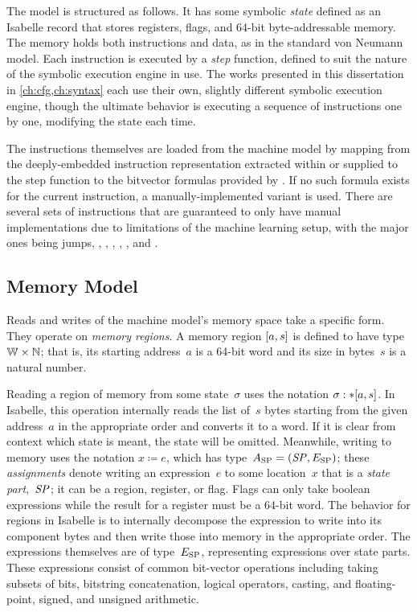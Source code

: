 The model is structured as follows.
It has some symbolic \emph{state} defined as an Isabelle record
that stores registers, flags, and 64-bit byte-addressable memory.
The memory holds both instructions and data, as in the standard von Neumann model.%
Each instruction is executed by a \emph{step} function,%
defined to suit the nature of the symbolic execution engine in use.
The works presented in this dissertation in \cref{ch:cfg,ch:syntax}
each use their own, slightly different symbolic execution engine,
though the ultimate behavior is executing a sequence of instructions one by one,
modifying the state each time.

The instructions themselves are loaded from the machine model
by mapping from the deeply-embedded instruction representation
extracted within or supplied to the step function
to the bitvector formulas provided by \textcite{roessle2019}.
If no such formula exists for the current instruction,
a manually-implemented variant is used.
There are several sets of instructions
that are guaranteed to only have manual implementations due to limitations
of the machine learning setup, with the major ones being
jumps, , , , ,
, and .

\subsection{Memory Model}
Reads and writes of the machine model's memory space take a specific form.
They operate on \emph{memory regions}.%
A memory region $[a,s]$ is defined to have type $\mathbb{W}\times\mathbb N$;%
%
that is, its starting address~$a$ is a 64-bit word
and its size in bytes~$s$ is a natural number.

Reading a region of memory from some state~$\sigma$
uses the notation $\sigma:\ast[a,s]$.
In Isabelle, this operation internally reads the list of~$s$ bytes
starting from the given address~$a$ in the appropriate order
and converts it to a word.
If it is clear from context which state is meant, the state will be omitted.
Meanwhile, writing to memory uses the notation $x\coloneqq e$,
which has type~$A_\mathrm{SP}=(\mathit{SP},E_\mathrm{SP})$;
these \emph{assignments} denote writing an expression~$e$ to some location~$x$
that is a \emph{state part},~$\mathit{SP}$;%
%
it can be a region, register, or flag.
Flags can only take boolean expressions while
the result for a register must be a 64-bit word.
The behavior for regions in Isabelle
is to internally decompose the expression to write
into its component bytes and then write those into memory in the appropriate order.
The expressions themselves are of type~$E_\mathrm{SP}$,%
representing expressions over state parts.
These expressions consist of common bit-vector operations including
taking subsets of bits, bitstring concatenation, logical operators, casting,
and floating-point, signed, and unsigned arithmetic.

